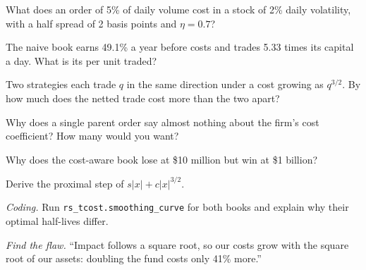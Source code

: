 \begin{exercise}[$\star$]\label{exo:rs:transaction-costs-in-research:1}
What does an order of 5\% of daily volume cost in a stock of 2\% daily volatility, with a half spread of 2 basis points and $\eta = 0.7$?
\end{exercise}

\begin{exercise}[$\star$]\label{exo:rs:transaction-costs-in-research:2}
The naive book earns 49.1\% a year before costs and trades 5.33 times its capital a day. What is its  per unit traded?
\end{exercise}

\begin{exercise}[$\star$]\label{exo:rs:transaction-costs-in-research:3}
Two strategies each trade $q$ in the same direction under a cost growing as $q^{3/2}$. By how much does the netted trade cost more than the two apart?
\end{exercise}

\begin{exercise}[$\star\star$]\label{exo:rs:transaction-costs-in-research:4}
Why does a single parent order say almost nothing about the firm's cost coefficient? How many would you want?
\end{exercise}

\begin{exercise}[$\star\star$]\label{exo:rs:transaction-costs-in-research:5}
Why does the cost-aware book lose at \$10 million but win at \$1 billion?
\end{exercise}

\begin{exercise}[$\star\star$]\label{exo:rs:transaction-costs-in-research:6}
Derive the proximal step of $s\lvert x\rvert + c\lvert x\rvert^{3/2}$.
\end{exercise}

\begin{exercise}[$\star\star\star$]\label{exo:rs:transaction-costs-in-research:7}
\emph{Coding.} Run \texttt{rs\_tcost.smoothing\_curve} for both books and explain why their optimal half-lives differ.
\end{exercise}

\begin{exercise}[$\star\star\star$]\label{exo:rs:transaction-costs-in-research:8}
\emph{Find the flaw.} ``Impact follows a square root, so our costs grow with the square root of our assets: doubling the fund costs only 41\% more.''
\end{exercise}

